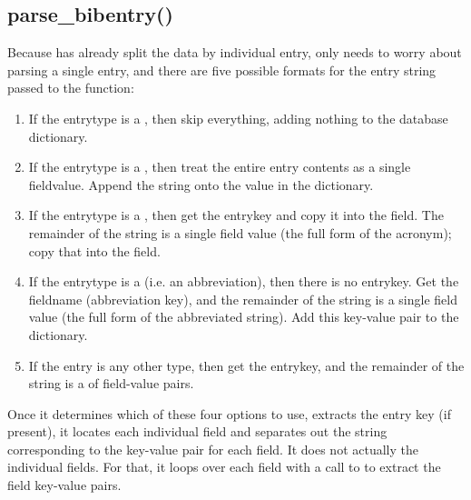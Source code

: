 \documentclass[letterpaper,10pt,english]{sphinxmanual}
\begin{document}
\subsection{parse\_bibentry()}
\label{\detokenize{developer_guide:parse-bibentry}}
Because  has already split the data by individual entry,  only needs to worry about parsing a single entry, and there are five possible formats for the entry string passed to the function:
\begin{enumerate}
\item {} 
If the entrytype is a , then skip everything, adding nothing to the database dictionary.

\item {} 
If the entrytype is a , then treat the entire entry contents as a single fieldvalue. Append the string onto the  value in the  dictionary.

\item {} 
If the entrytype is a , then get the entrykey and copy it into the  field. The remainder of the string is a single field value (the full form of the acronym); copy that into the  field.

\item {} 
If the entrytype is a  (i.e. an abbreviation), then there is no entrykey. Get the fieldname (abbreviation key), and the remainder of the string is a single field value (the full form of the abbreviated string). Add this key-value pair to the  dictionary.

\item {} 
If the entry is any other type, then get the entrykey, and the remainder of the string is a  of field-value pairs.

\end{enumerate}

Once it determines which of these four options to use,  extracts the entry key (if present), it locates each individual field and separates out the string corresponding to the key-value pair for each field. It does not actually  the individual fields. For that, it loops over each field with a call to  to extract the field key-value pairs.
\end{document}
